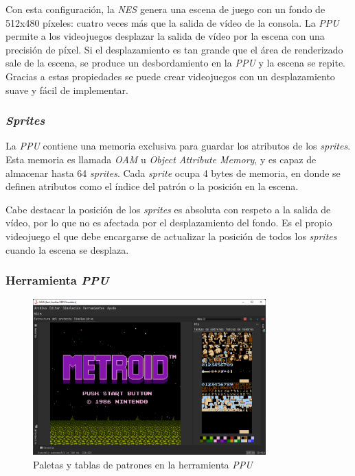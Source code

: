 Con esta configuración, la \textit{NES} genera una escena de juego
con un fondo de 512x480 píxeles: cuatro veces más que la salida
de vídeo de la consola.
La \textit{PPU} permite a los videojuegos desplazar la salida
de vídeo por la escena con una precisión de píxel.
Si el desplazamiento es tan grande que el área de renderizado
sale de la escena, se produce un desbordamiento en la \textit{PPU}
y la escena se repite.
Gracias a estas propiedades se puede crear videojuegos con
un desplazamiento suave y fácil de implementar.

\subsubsection{\textit{Sprites}}\label{subsubsec:sprites}

La \textit{PPU} contiene una memoria exclusiva para guardar
los atributos de los \textit{sprites}.
Esta memoria es llamada \textit{OAM} u \textit{Object Attribute Memory}\cite{OAM},
y es capaz de almacenar hasta 64 \textit{sprites}.
Cada \textit{sprite} ocupa 4 bytes de memoria, en donde se
definen atributos como el índice del patrón o la posición en la escena.

Cabe destacar la posición de los \textit{sprites} es
absoluta con respeto a la salida de vídeo, por lo que no
es afectada por el desplazamiento del fondo.
Es el propio videojuego el que debe encargarse
de actualizar la posición de todos los \textit{sprites}
cuando la escena se desplaza.

\subsubsection{Herramienta \textit{PPU}}

\begin{figure}[h]
    \centering
    \includegraphics[width=0.8\textwidth]{images/nes/nes-patterntables}
    \caption{Paletas y tablas de patrones en la herramienta \textit{PPU}}
    \label{fig:nes-patterntables}
\end{figure}

